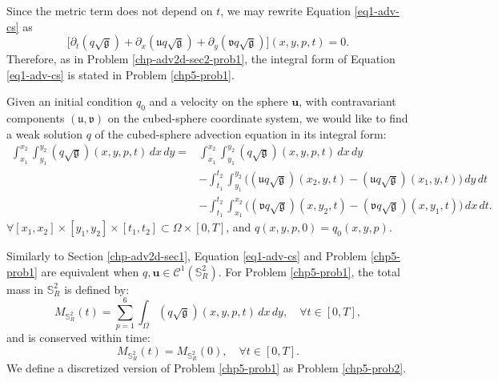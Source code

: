 Since the metric term does not depend on $t$, we may rewrite Equation \eqref{eq1-adv-cs} as
\begin{equation}
	\label{eq2-adv-cs}
	\bigg[{\partial}_t{(q \sqrt{\mathfrak{g}})}+
	{\partial}_x{(\mathfrak{u}q \sqrt{\mathfrak{g}})}+
	{\partial}_y{(\mathfrak{v}q \sqrt{\mathfrak{g}})}
	\bigg](x,y,p,t)
	= 0.
\end{equation}
Therefore, as in Problem \eqref{chp-adv2d-sec2-prob1}, the integral form of Equation \eqref{eq1-adv-cs}
is stated in Problem \eqref{chp5-prob1}.
\begin{prob}
	\label{chp5-prob1}
	Given an initial condition ${q}_0$ and
	a velocity on the sphere $\boldsymbol{u}$, with contravariant components $(\mathfrak{u},\mathfrak{v})$ on the cubed-sphere coordinate system,
	we would like to find a weak solution ${q}$
	of the cubed-sphere advection equation in its integral form:
	\begin{align*}
		\int_{x_1}^{x_2} \int_{y_1}^{y_2}
		{(q\sqrt{\mathfrak{g}})}(x, y, p, t) \,dx \,dy = &\int_{x_1}^{x_2} \int_{y_1}^{y_2}
		{(q\sqrt{\mathfrak{g}})}(x, y, p, t) \,dx \,dy \\ \nonumber
		&-\int_{t_1}^{t_2} \int_{y_1}^{y_2} \bigg({(\mathfrak{u}q\sqrt{\mathfrak{g}})}(x_2, y, t)
		-{(\mathfrak{u}q\sqrt{\mathfrak{g}})}(x_1, y, t) \bigg) \,dy \,dt\\ \nonumber
		&-\int_{t_1}^{t_2} \int_{x_1}^{x_2} \bigg({(\mathfrak{v}q\sqrt{\mathfrak{g}})}(x, y_2, t)
		-{(\mathfrak{v}q\sqrt{\mathfrak{g}})}(x, y_1, t) \bigg) \,dx \,dt.
	\end{align*}
	$\forall [x_1, x_2]\times [y_1, y_2] \times[t_1, t_2] \subset \Omega \times[0,T]$, and
	$q(x,y,p,0)=q_0(x,y,p)$.
\end{prob}
Similarly to Section \ref{chp-adv2d-sec1}, Equation \eqref{eq1-adv-cs} and Problem \eqref{chp5-prob1} are equivalent
when ${q}, \boldsymbol{u} \in \mathcal{C}^1(\mathbb{S}^2_R)$.
For Problem \ref{chp5-prob1}, the total mass in $\mathbb{S}^2_R$ is defined by: 
\begin{equation}
	{M}_{\mathbb{S}^2_R}(t) = \sum_{p=1}^6 \int_{\Omega} {(q\sqrt{\mathfrak{g}})}(x,y,p,t) \,dx \,dy , \quad \forall t \in [0,T],
\end{equation}
and is conserved within time: 
\begin{equation}
	{M}_{\mathbb{S}^2_R}(t) = {M}_{\mathbb{S}^2_R}(0), \quad \forall t \in [0,T].
\end{equation}
We define a discretized version of Problem \eqref{chp5-prob1} as Problem \eqref{chp5-prob2}.
